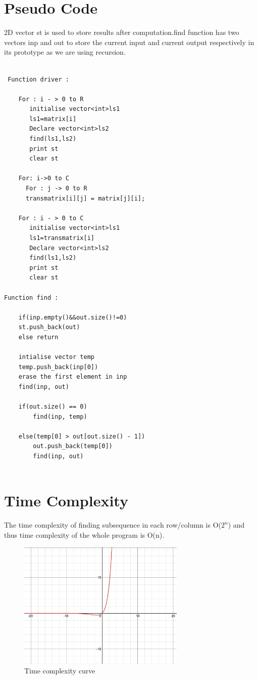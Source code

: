 \documentclass[conference]{IEEEtran}
\begin{document}
\section{\textbf{Pseudo Code}}

2D vector st is used to store results after computation.find function has two vectors inp and out to store the current input and current output respectively in its prototype as we are using recursion.
\begin{lstlisting}

 Function driver :

	For : i - > 0 to R  
	   initialise vector<int>ls1
	   ls1=matrix[i]
	   Declare vector<int>ls2
       find(ls1,ls2)
       print st 
       clear st 
    
    For: i->0 to C
      For : j -> 0 to R
      transmatrix[i][j] = matrix[j][i];
      
    For : i - > 0 to C 
	   initialise vector<int>ls1
	   ls1=transmatrix[i]
	   Declare vector<int>ls2
       find(ls1,ls2)
       print st
       clear st 
        
Function find :
    
    if(inp.empty()&&out.size()!=0)
    st.push_back(out)
    else return
    
    intialise vector temp
    temp.push_back(inp[0])
    erase the first element in inp
    find(inp, out)
    
    if(out.size() == 0)
		find(inp, temp)
	
    else(temp[0] > out[out.size() - 1])
		out.push_back(temp[0])
		find(inp, out)


\end{lstlisting}

\section{\textbf {Time Complexity}}
\noindent The time complexity of finding subsequence in each row/column is O({$2^n$}) and thus time complexity of the whole program is O(n).

\begin{figure}[htp]
    \centering
    \includegraphics[width=8cm]{TimeComplexity}
    \caption{Time complexity curve}
    \label{fig:timecomplexity.png}
\end{figure}
\end{document}
